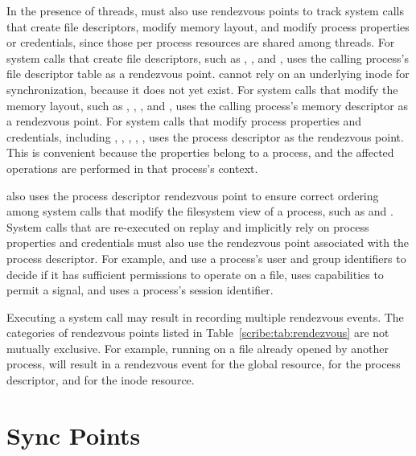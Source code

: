 In the presence of threads, \scribe{} must also use rendezvous points
to track system calls that create file descriptors, modify memory
layout, and modify process properties or credentials, since those
per process resources are shared among threads.  
For system calls that create file descriptors, such as
, , and , \scribe{} uses the calling
process's file descriptor table as a rendezvous point.  \scribe{}
cannot rely on an underlying inode for synchronization, because it
does not yet exist.  
For system calls that modify the memory layout, such as ,
, , and , \scribe{}
uses the calling process's memory descriptor as a rendezvous point.  
For system calls that modify process properties and credentials,
including , , , ,
, \scribe{} uses the process descriptor as the
rendezvous point.  This is convenient because the properties belong to
a process, and the affected operations are performed in that process's
context. 

\scribe{} also uses the process descriptor rendezvous point
to ensure correct ordering among system calls that modify the
filesystem view of a process, such as  and .
System calls that are re-executed on replay and
implicitly rely on process properties and credentials must also use the
rendezvous point associated with the process descriptor. For example,
 and  use a process's user and group
identifiers to decide if it has sufficient permissions to operate on a
file,  uses capabilities to permit a signal, and
 uses a process's session identifier. 

Executing a system call may result in recording multiple
rendezvous events.  The categories of rendezvous points listed in
Table~\ref{scribe:tab:rendezvous} are not mutually exclusive.  For example,
running  on a file already opened by another process, will
result in a rendezvous event for the global resource, for the process
descriptor, and for the inode resource.  

\section{Sync Points}
\label{scribe:sec:sync}

